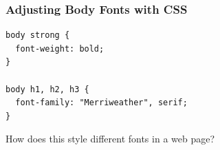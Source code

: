 \documentclass[14pt,aspectratio=169]{beamer}
\begin{document}
%
\begin{frame}[fragile]
  \frametitle{Adjusting Body Fonts with CSS}
  \normalsize
  \hspace*{.25in}
  \begin{minipage}{6in}
    \vspace*{.15in}
    \begin{verbatim}
body strong {
  font-weight: bold;
}

body h1, h2, h3 {
  font-family: "Merriweather", serif;
}
    \end{verbatim}
  \end{minipage}
  \vspace*{-.05in}
  \begin{center}
    \noindent How does this style different fonts in a web page? \\
  \end{center}
\end{frame}
\end{document}
